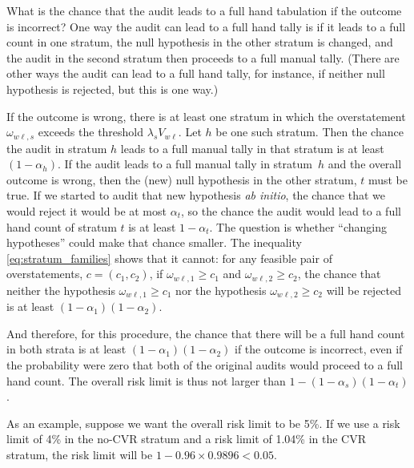 What is the chance that the audit leads to a full hand tabulation if the outcome is incorrect?
One way the audit can lead to a full hand tally is if it leads to a full count in one stratum, 
the null hypothesis in the other stratum is changed, and the audit in the second 
stratum then proceeds to a full manual tally.
(There are other ways the audit can lead to a full hand tally, for instance, if neither
null hypothesis is rejected, but this is one way.)

If the outcome is wrong, there is at least one stratum in which the overstatement 
$\omega_{w\ell,s}$ 
exceeds the threshold $\lambda_s V_{w\ell}$.
Let $h$ be one such stratum. 
Then the chance the audit in stratum $h$ leads to a full manual tally in that stratum
is at least $(1-\alpha_h)$.
If the audit leads to a full manual tally in stratum~$h$ and the overall outcome is wrong,
then the (new) null hypothesis in the other stratum, $t$ must be true.
If we started to audit that new hypothesis \emph{ab initio}, the chance that we would reject it
would be at most $\alpha_t$, so the chance the audit would lead to a full hand count 
of stratum $t$ is at least $1-\alpha_t$.
The question is whether ``changing hypotheses'' could make that chance smaller.
The inequality \ref{eq:stratum_families} shows that it cannot: for any feasible pair of
overstatements, $c = (c_1, c_2)$, if $\omega_{w\ell,1} \ge c_1$ and $\omega_{w\ell,2} \ge c_2$,
the chance that neither the hypothesis $\omega_{w\ell,1} \ge c_1$ nor the hypothesis 
$\omega_{w\ell,2} \ge c_2$ will be rejected is at least $(1-\alpha_1)(1-\alpha_2)$.

And therefore, for this procedure, the chance that there will be a full hand count in both strata is at least 
$(1-\alpha_1)(1-\alpha_2)$ if the outcome is incorrect,
even if the probability were zero that both of the original audits would proceed to a full hand count.
The overall risk limit is thus not larger than $1 - (1-\alpha_s)(1-\alpha_t)$.

As an example, suppose we want the overall risk limit to be 5\%. 
If we use a risk limit of 4\% in the no-CVR stratum and a risk limit of 1.04\% in the CVR stratum,
the risk limit will be $1 - 0.96\times 0.9896 < 0.05$.


